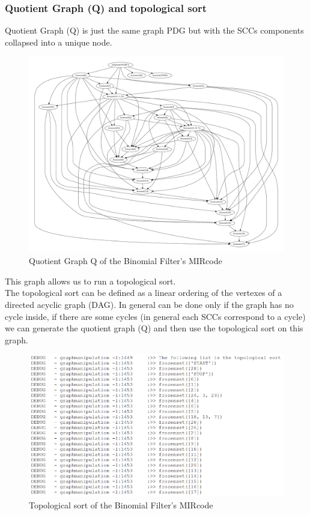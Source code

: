 {  \subsubsection{Quotient Graph (Q) and topological sort}
  
 
  Quotient Graph (Q) is just the same graph PDG but with the SCCs components collapsed into a unique node. 
  \begin{figure}[h!]
  	\centering
  	\includegraphics[width=\textwidth]{imm/tessa/Q.pdf} 	\caption{Quotient Graph Q of the Binomial Filter's MIRcode
  	} 
  	\label{q}
  \end{figure}
   This graph allows us to run a topological sort.\\
     The topological sort can be defined as a linear ordering of the vertexes of a directed acyclic graph (DAG). In general can be done only if the graph has no cycle inside, if there are some cycles (in general each SCCs correspond to a cycle) we can generate the quotient graph (Q) and then use the topological sort on this graph.
  
   \begin{figure}[h!]
   	\centering
   	\includegraphics[width=\textwidth]{imm/tessa/topsort.png} 	\caption{Topological sort of the Binomial Filter's MIRcode
   	} 
   	\label{topsort}
   \end{figure} 
   \clearpage
}
